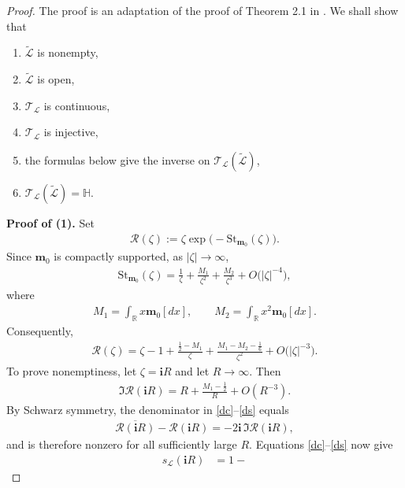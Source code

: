 \documentclass[11pt]{amsart}
\theoremstyle{plain}
\newcommand\RR{{\mathbb R}}
\newcommand\bm{\mathbf{m}}
\numberwithin{equation}{section}
\numberwithin{theorem}{section}
\numberwithin{figure}{section}
\begin{document}
\begin{proof}The proof is an adaptation of the proof of Theorem 2.1 in \cite{dm14}. We shall show that
\begin{enumerate}
    \item $\widetilde{\mathcal L}$ is nonempty,
    \item $\widetilde{\mathcal L}$ is open,
    \item $\mathcal T_{\mathcal L}$ is continuous,
    \item $\mathcal T_{\mathcal L}$ is injective,
    \item the formulas below give the inverse on $\mathcal T_{\mathcal L}(\widetilde{\mathcal L})$,
    \item $\mathcal T_{\mathcal L}(\widetilde{\mathcal L})=\mathbb H$.
\end{enumerate}
\bigskip
\textbf{Proof of (1).} Set
\begin{align*}
    \mathscr R(\zeta)
    :=
    \zeta\exp\bigl(-\mathrm{St}_{\bm_0}(\zeta)\bigr).
\end{align*}
Since $\bm_0$ is compactly supported, as $|\zeta|\to\infty$,
\begin{align}
    \mathrm{St}_{\bm_0}(\zeta)
    =
    \frac{1}{\zeta}
    +\frac{M_1}{\zeta^2}
    +\frac{M_2}{\zeta^3}
    +O\bigl(|\zeta|^{-4}\bigr),
    \label{est}
\end{align}
where
\begin{align*}
    M_1=\int_{\RR}x\bm_0[dx],
    \qquad
    M_2=\int_{\RR}x^2\bm_0[dx].
\end{align*}
Consequently,
\begin{align*}
    \mathscr R(\zeta)
    =
    \zeta-1
    +\frac{\frac12-M_1}{\zeta}
    +\frac{M_1-M_2-\frac16}{\zeta^2}
    +O\bigl(|\zeta|^{-3}\bigr).
\end{align*}
To prove nonemptiness, let $\zeta=\mathbf iR$ and let $R\to\infty$.
Then
\begin{align*}
    \Im\mathscr R(\mathbf iR)
    =
    R+\frac{M_1-\frac12}{R}+O(R^{-3}).
\end{align*}
By Schwarz symmetry, the denominator in \eqref{dc}--\eqref{ds} equals
\begin{align*}
    \overline{\mathscr R(\mathbf iR)}-\mathscr R(\mathbf iR)
    =
    -2\mathbf i\,\Im\mathscr R(\mathbf iR),
\end{align*}
and is therefore nonzero for all sufficiently large $R$.  Equations
\eqref{dc}--\eqref{ds} now give
\begin{align*}
    s_{\mathcal L}(\mathbf iR)
    &=
    1-

\end{align*}
\end{proof}
\end{document}
